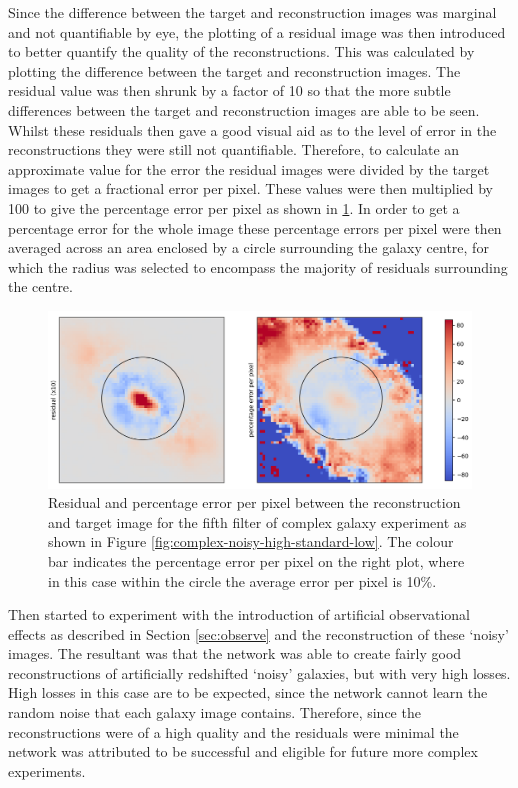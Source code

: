 \documentclass[fleqn,usenatbib]{mnras}
\begin{document}
Since the difference between the target and reconstruction images was marginal and not quantifiable by eye, the plotting of a residual image was then introduced to better quantify the quality of the reconstructions. This was calculated by plotting the difference between the target and reconstruction images. The residual value was then shrunk by a factor of 10 so that the more subtle differences between the target and reconstruction images are able to be seen. Whilst these residuals then gave a good visual aid as to the level of error in the reconstructions they were still not quantifiable. Therefore, to calculate an approximate value for the error the residual images were divided by the target images to get a fractional error per pixel. These values were then multiplied by 100 to give the percentage error per pixel as shown in \ref{fig:errorplot}. In order to get a percentage error for the whole image these percentage errors per pixel were then averaged across an area enclosed by a circle surrounding the galaxy centre, for which the radius was selected to encompass the majority of residuals surrounding the centre.

\begin{figure}
	\includegraphics[width=\columnwidth]{Figures/percetage_error.png}
    \caption{Residual and percentage error per pixel between the reconstruction and target image for the fifth filter of complex galaxy experiment as shown in Figure \ref{fig:complex-noisy-high-standard-low}. The colour bar indicates the percentage error per pixel on the right plot, where in this case within the circle the average error per pixel is 10\%.}
    \label{fig:errorplot}
\end{figure}

Then started to experiment with the introduction of artificial observational effects as described in Section \ref{sec:observe} and the reconstruction of these ‘noisy’ images. The resultant was that the network was able to create fairly good reconstructions of artificially redshifted ‘noisy' galaxies, but with very high losses. High losses in this case are to be expected, since the network cannot learn the random noise that each galaxy image contains. Therefore, since the reconstructions were of a high quality and the residuals were minimal the network was attributed to be successful and eligible for future more complex experiments.
\end{document}
